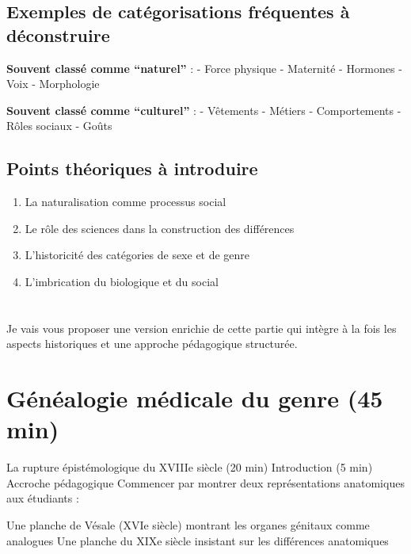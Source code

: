 \documentclass[
  letterpaper,
  DIV=11,
  numbers=noendperiod]{scrreprt}
\providecommand{\tightlist}{%
  \setlength{\itemsep}{0pt}\setlength{\parskip}{0pt}}\usepackage{longtable,booktabs,array}
\begin{document}
\section{Exemples de catégorisations fréquentes à
déconstruire}\label{exemples-de-catuxe9gorisations-fruxe9quentes-uxe0-duxe9construire}

\textbf{Souvent classé comme ``naturel''} : - Force physique - Maternité
- Hormones - Voix - Morphologie

\textbf{Souvent classé comme ``culturel''} : - Vêtements - Métiers -
Comportements - Rôles sociaux - Goûts

\section{Points théoriques à
introduire}\label{points-thuxe9oriques-uxe0-introduire}

\begin{enumerate}
\def\labelenumi{\arabic{enumi}.}
\tightlist
\item
  La naturalisation comme processus social
\item
  Le rôle des sciences dans la construction des différences
\item
  L'historicité des catégories de sexe et de genre
\item
  L'imbrication du biologique et du social
\end{enumerate}


\chapter{}\label{section}

Je vais vous proposer une version enrichie de cette partie qui intègre à
la fois les aspects historiques et une approche pédagogique structurée.


\chapter{Généalogie médicale du genre (45
min)}\label{guxe9nuxe9alogie-muxe9dicale-du-genre-45-min}

La rupture épistémologique du XVIIIe siècle (20 min) Introduction (5
min) Accroche pédagogique Commencer par montrer deux représentations
anatomiques aux étudiants :

Une planche de Vésale (XVIe siècle) montrant les organes génitaux comme
analogues Une planche du XIXe siècle insistant sur les différences
anatomiques
\end{document}
